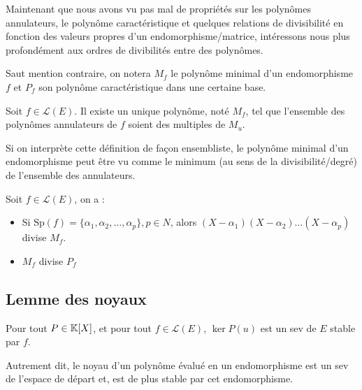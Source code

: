 Maintenant que nous avons vu pas mal de propriétés sur les polynômes annulateurs, le polynôme caractéristique et quelques
relations de divisibilité en fonction des valeurs propres d'un endomorphisme/matrice, intéressons nous plus profondément 
aux ordres de divibilités entre des polynômes. 

\vspace{0.3cm}

Saut mention contraire, on notera $M_f$ le polynôme minimal d'un endomorphisme $f$ et $P_f$ son polynôme caractéristique 
dans une certaine base. 

\begin{definition}
    Soit $f \in \mathcal{L}(E)$. Il existe un unique polynôme, noté $M_f$, tel que l'ensemble des polynômes annulateurs 
    de $f$ soient des multiples de $M_u$. 

    \vspace{0.3cm}

    Si on interprète cette définition de façon ensembliste, le polynôme minimal d'un endomorphisme peut être vu 
    comme le minimum (au sens de la divisibilité/degré) de l'ensemble des annulateurs. 
\end{definition}

\begin{proposition}
    Soit $f \in \mathcal{L}(E)$, on a :
    \begin{itemize}
        \item Si $\text{Sp}(f) = \{\alpha_1, \alpha_2, \dots, \alpha_p\}, p \in N$, alors $(X - \alpha_1)(X - \alpha_2) \dots (X - \alpha_p)$ divise $M_f$.
        \item $M_f$ divise $P_f$
    \end{itemize}
\end{proposition}

\newpage 

\subsection{Lemme des noyaux}

\begin{prop}
    Pour tout $P \in \mathbb{K}[X]$, et pour tout $f \in \mathcal{L}(E)$, $\ker P(u)$ est un sev de $E$ stable par $f$. 

    \vspace{0.3cm}

    Autrement dit, le noyau d'un polynôme évalué en un endomorphisme est un sev de l'espace de départ et, est de plus stable par cet endomorphisme. 
\end{prop}

